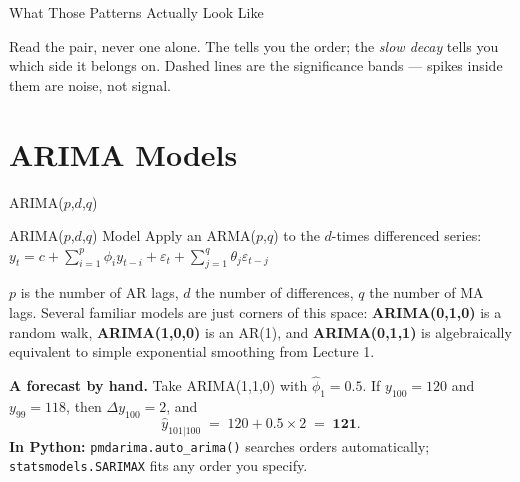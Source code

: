 \documentclass[aspectratio=169, 11pt]{beamer}
\begin{document}
\begin{frame}{What Those Patterns Actually Look Like}
\begin{center}
  \end{center}
  \vspace{0.1cm}
  Read the pair, never one alone. The  tells you the order; the
  \emph{slow decay} tells you which side it belongs on. Dashed lines are the significance
  bands --- spikes inside them are noise, not signal.
\end{frame}

\section{ARIMA Models}


\begin{frame}{ARIMA($p$,$d$,$q$)}
  \begin{definitionbox}{ARIMA($p$,$d$,$q$) Model}
    {\small Apply an ARMA($p$,$q$) to the $d$-times differenced series:
    $y_t = c + \sum_{i=1}^{p}\phi_i y_{t-i} + \varepsilon_t + \sum_{j=1}^{q}\theta_j\varepsilon_{t-j}$}
  \end{definitionbox}
  $p$ is the number of AR lags, $d$ the number of differences, $q$ the number of MA lags.
  Several familiar models are just corners of this space: \textbf{ARIMA(0,1,0)} is a random
  walk, \textbf{ARIMA(1,0,0)} is an AR(1), and \textbf{ARIMA(0,1,1)} is algebraically
  equivalent to simple exponential smoothing from Lecture 1.

  \vspace{0.15cm}
  \textbf{A forecast by hand.} Take ARIMA(1,1,0) with $\hat{\phi}_1 = 0.5$. If
  $y_{100} = 120$ and $y_{99} = 118$, then $\Delta y_{100} = 2$, and
  \[
    \hat{y}_{101|100} \;=\; 120 + 0.5 \times 2 \;=\; \mathbf{121}.
  \]
  \vspace{-0.2cm}
  \textbf{In Python:} \texttt{pmdarima.auto\_arima()} searches orders automatically;
  \texttt{statsmodels.SARIMAX} fits any order you specify.
\end{frame}
\end{document}
